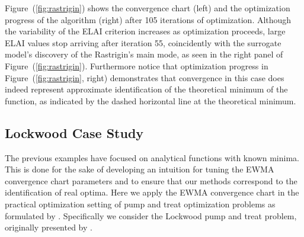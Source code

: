 \documentclass{article}
\begin{document}
%
%

%
Figure~(\ref{fig:rastrigin}) shows the convergence chart (left) and the 
optimization progress of the algorithm (right) after 105 iterations of 
optimization. Although the variability of the ELAI criterion increases as 
optimization proceeds, large ELAI values stop arriving after iteration 55, 
coincidently with the surrogate model's discovery of the Rastrigin's main 
mode, as seen in the right panel of Figure~(\ref{fig:rastrigin}). Furthermore 
notice that optimization progress in Figure~(\ref{fig:rastrigin}, right) 
demonstrates that convergence in this case does indeed represent approximate 
identification of the theoretical minimum of the function, as indicated by the 
dashed horizontal line at the theoretical minimum. 

%
%
%


%
%
\subsection{Lockwood Case Study}
\label{sec:lockwood}
%
%

The previous examples have focused on analytical functions with known 
minima. This is done for the sake of developing an intuition for tuning the 
EWMA convergence chart parameters and to ensure that our methods correspond to 
the identification of real optima. Here we apply the EWMA convergence chart in 
the practical optimization setting of pump and treat optimization problems as 
formulated by \cite{mayer2002optimal}. Specifically we consider the Lockwood 
pump and treat problem, originally presented by \cite{lockCite}. 
\end{document}
